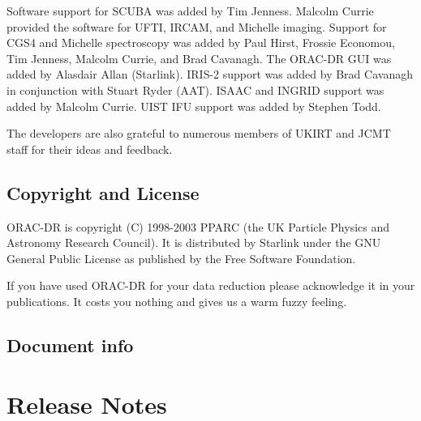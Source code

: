 \documentclass[twoside,11pt]{article}
\renewcommand{\_}{\texttt{\symbol{95}}}
\begin{document}
Software support for SCUBA was added by Tim Jenness.  Malcolm Currie
provided the software for UFTI, IRCAM, and Michelle imaging.  Support
for CGS4 and Michelle spectroscopy was added by Paul Hirst, Frossie
Economou, Tim Jenness, Malcolm Currie, and Brad Cavanagh.  The ORAC-DR
GUI was added by Alasdair Allan (Starlink). IRIS-2 support was added
by Brad Cavanagh in conjunction with Stuart Ryder (AAT). ISAAC and
INGRID support was added by Malcolm Currie. UIST IFU support was added
by Stephen Todd.



The developers are also grateful to numerous members of UKIRT and JCMT
staff for their ideas and feedback.

\subsection*{Copyright and License\label{ORAC-DR_Copyright_and_License}}


ORAC-DR is copyright (C) 1998-2003 PPARC (the UK Particle Physics and Astronomy
Research Council). It is distributed by Starlink under the
GNU General Public License as published by the Free Software Foundation.



If you have used ORAC-DR for your data reduction please acknowledge it
in your publications.  It costs you nothing and gives us a warm fuzzy
feeling.

\subsection*{Document info\label{ORAC-DR_Document_info}}

\section{Release Notes}
\end{document}
